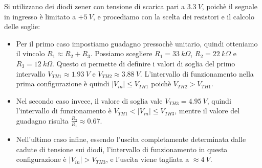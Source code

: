 Si utilizzano dei diodi zener con tensione di scarica pari a $3.3\ V$, poichè il segnale in
ingresso è limitato a $+5\ V$, e procediamo con la scelta dei resistori e il calcolo delle
soglie:

\begin{itemize}
    \item Per il primo caso impostiamo guadagno pressochè unitario, quindi otteniamo il vincolo
          $R_1\approx R_2+R_3$. Possiamo scegliere $R_1=33\ k\Omega$, $R_2=22\ k\Omega$ e $R_3=12\ k\Omega$.
          Questo ci permette di definire i valori di soglia del primo intervallo $V_{TH1}\approx1.93\ V$
          e $V_{TH2}\approx3.88\ V$. L'intervallo di funzionamento nella prima configurazione è quindi
          $|V_{in}|\leq V_{TH1}$ poichè $V_{TH2}>V_{TH1}$.

    \item Nel secondo caso invece, il valore di soglia vale $V_{TH3}=4.95\ V$, quindi l'intervallo di
          funzionamento è $V_{TH1}<|V_{in}|\leq V_{TH3}$, mentre il valore del guadagno risulta
          $\frac{R_2}{R_1}\approx0.67$.

    \item Nell'ultimo caso infine, essendo l'uscita completamente determinata dalle cadute di tensione
          sui diodi, l'intervallo di funzionamento in questa configurazione è $|V_{in}|>V_{TH3}$, e
          l'uscita viene tagliata a $\approx4\ V$.

\end{itemize}

